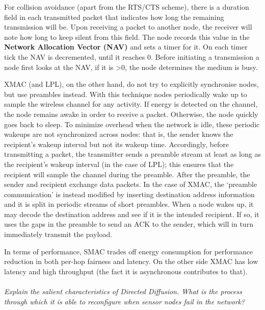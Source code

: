 \documentclass[12pt]{article}
\newcommand*\circled[1]{\tikz[baseline=(char.base)]{
		\node[shape=circle,draw,inner sep=0pt] (char) {#1};}}
\begin{document}
For collision avoidance (apart from the RTS/CTS scheme), there is a duration
field in each transmitted packet that indicates how long the remaining
transmission will be. Upon receiving a packet to another node, the receiver
will note how long to keep silent from this field. The node records this value
in the \textbf{Network Allocation Vector (NAV)} and sets a timer for it. On
each timer tick the NAV is decremented, until it reaches 0. Before initiating
a transmission a node first looks at the NAV, if it is >0, the node determines
the medium is busy.

XMAC (and LPL), on the other hand, do not try to explicitly synchronise nodes,
but use preambles instead. With this technique nodes periodically wake up to
sample the wireless channel for any activity. If energy is detected on the
channel, the node remains awake in order to receive a packet. Otherwise, the
node quickly goes back to sleep. To minimize overhead when the network is idle,
these periodic wakeups are not synchronized across nodes: that is, the sender
knows the recipient's wakeup interval but not its wakeup time. Accordingly,
before transmitting a packet, the transmitter sends a preamble stream at least
as long as the recipient's wakeup interval (in the case of LPL); this ensures
that the recipient will sample the channel during the preamble. After the
preamble, the sender and recipient exchange data packets. In the case of XMAC,
the `preamble communication' is instead modified by inserting destination
address information and it is split in periodic streams of short preambles.
When a node wakes up, it may decode the destination address and see if it is
the intended recipient. If so, it uses the gaps in the preamble to send an ACK
to the sender, which will in turn immediately transmit the payload.

In terms of performance, SMAC trades off energy consumption for performance
reduction in both per-hop fairness and latency. On the other side XMAC has low
latency and high throughput (the fact it is asynchronous contributes to that).
\\
\\
\textit{\circled{8.} Explain the salient characteristics of Directed Diffusion.
What is the process through which it is able to reconfigure when sensor nodes
fail in the network?}
\end{document}
